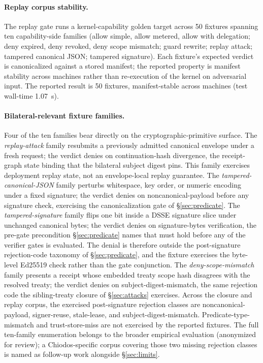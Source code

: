 \paragraph{Replay corpus stability.} The replay gate runs a kernel-capability golden target across 50 fixtures spanning ten capability-side families (allow simple, allow metered, allow with delegation; deny expired, deny revoked, deny scope mismatch; guard rewrite; replay attack; tampered canonical JSON; tampered signature). Each fixture's expected verdict is canonicalized against a stored manifest; the reported property is manifest stability across machines rather than re-execution of the kernel on adversarial input. The reported result is 50 fixtures, manifest-stable across machines (test wall-time 1.07~s).

\paragraph{Bilateral-relevant fixture families.} Four of the ten families bear directly on the cryptographic-primitive surface. The \emph{replay-attack} family resubmits a previously admitted canonical envelope under a fresh request; the verdict denies on continuation-hash divergence, the receipt-graph state binding that the bilateral subject digest pins. This family exercises deployment replay state, not an envelope-local replay guarantee. The \emph{tampered-canonical-JSON} family perturbs whitespace, key order, or numeric encoding under a fixed signature; the verdict denies on noncanonical-payload before any signature check, exercising the canonicalization gate of \S\ref{sec:predicate}. The \emph{tampered-signature} family flips one bit inside a DSSE signature slice under unchanged canonical bytes; the verdict denies on signature-bytes verification, the pre-gate precondition \S\ref{sec:predicate} names that must hold before any of the verifier gates is evaluated. The denial is therefore outside the post-signature rejection-code taxonomy of \S\ref{sec:predicate}, and the fixture exercises the byte-level Ed25519 check rather than the gate conjunction. The \emph{deny-scope-mismatch} family presents a receipt whose embedded treaty scope hash disagrees with the resolved treaty; the verdict denies on subject-digest-mismatch, the same rejection code the sibling-treaty closure of \S\ref{sec:attacks} exercises. Across the closure and replay corpus, the exercised post-signature rejection classes are noncanonical-payload, signer-reuse, stale-lease, and subject-digest-mismatch. Predicate-type-mismatch and trust-store-miss are not exercised by the reported fixtures. The full ten-family enumeration belongs to the broader empirical evaluation (anonymized for review); a Chiodos-specific corpus covering those two missing rejection classes is named as follow-up work alongside \S\ref{sec:limits}.

